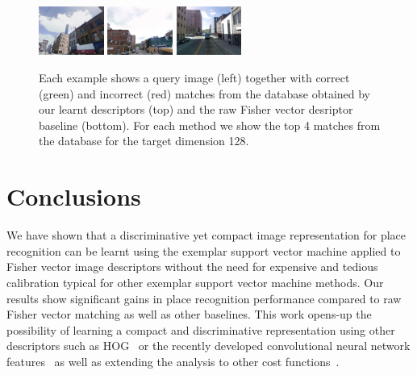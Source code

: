 \documentclass[table]{article} %
\begin{document}
\begin{figure}[t!]
\begin{minipage}{0.75\linewidth}
\begin{minipage}{\linewidth}
                \colorbox{myGreen}{\includegraphics[height=16mm]{imgs/ex4/FV2}}
                \colorbox{myRed}{\includegraphics[height=16mm]{imgs/ex4/FV3}}
                \colorbox{myRed}{\includegraphics[height=16mm]{imgs/ex4/FV4}}
            \end{minipage} 
        \end{minipage}
        \caption{
            Each example shows a query image (left) together with correct (green) and incorrect (red) matches from the database obtained by our learnt descriptors (top) and the raw Fisher vector desriptor baseline (bottom). For each method we show the top 4 matches from the database for the target dimension 128.        
        }
        \label{fig:images}
    \end{figure}



\section{Conclusions}

We have shown that a discriminative yet compact image representation for place recognition can be learnt 
using the exemplar support vector machine applied to Fisher vector image descriptors without the need
for expensive and tedious calibration typical for other exemplar support vector machine methods.
Our results show significant gains in place recognition performance compared to raw Fisher vector matching
as well as other baselines. %
This work opens-up the possibility of learning a compact and discriminative representation using other descriptors such as
HOG~\cite{Dalal05} or the recently developed convolutional neural network features~\cite{Donahue13,Krizhevsky12,Oquab14,Sermanet13}
as well as extending the analysis to other cost functions~\cite{Gharbi12,Hariharan12}. 
 


\small{
	
	
	}
\end{document}
